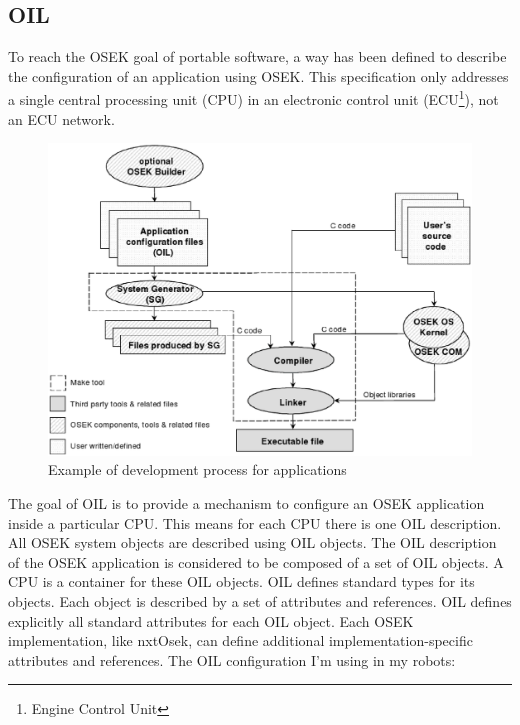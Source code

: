 \subsection{OIL}
To reach the OSEK goal of portable software, a way has been defined to describe the
configuration of an application using OSEK.
This specification only addresses a single central processing unit (CPU) in an electronic control
unit (ECU\footnote{Engine Control Unit}), not an ECU network.
\begin{figure}[htbp]
\begin{center}
\includegraphics[scale=0.4]{figures/nxtosek/oil1.eps}
\caption{Example of development process for applications}
\end{center}
\end{figure}
The goal of OIL is to provide a mechanism to configure an OSEK application inside a
particular CPU. This means for each CPU there is one OIL description.
All OSEK system objects are described using OIL objects.
The OIL description of the OSEK application is considered to be composed of a set of OIL
objects. A CPU is a container for these OIL objects.
OIL defines standard types for its objects. Each object is described by a set of attributes and
references. OIL defines explicitly all standard attributes for each OIL object.
Each OSEK implementation, like nxtOsek, can define additional implementation-specific attributes and
references.
The OIL configuration I'm using in my robots:
